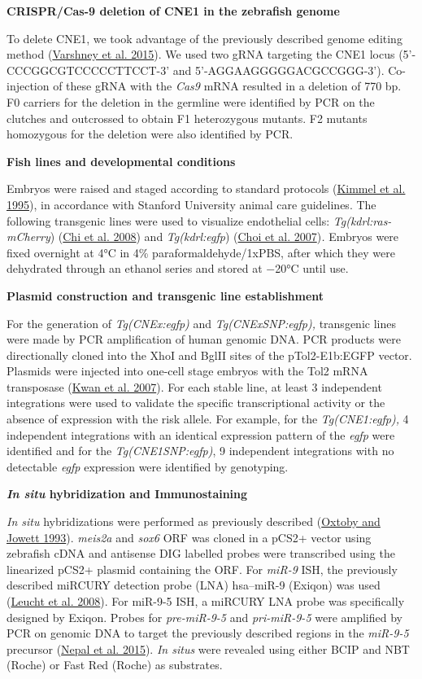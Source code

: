 \documentclass[]{article}
\begin{document}
\textbf{CRISPR/Cas-9 deletion of CNE1 in the zebrafish genome}

To delete CNE1, we took advantage of the previously described genome
editing method (\protect\hyperlink{_ENREF_33}{Varshney et al. 2015}). We
used two gRNA targeting the CNE1 locus (5'-CCCGGCGTCCCCCTTCCT-3' and
5'-AGGAAGGGGGACGCCGGG-3'). Co-injection of these gRNA with the
\emph{Cas9} mRNA resulted in a deletion of 770 bp. F0 carriers for the
deletion in the germline were identified by PCR on the clutches and
outcrossed to obtain F1 heterozygous mutants. F2 mutants homozygous for
the deletion were also identified by PCR.

\textbf{Fish lines and developmental conditions}

Embryos were raised and staged according to standard protocols
(\protect\hyperlink{_ENREF_14}{Kimmel et al. 1995}), in accordance with
Stanford University animal care guidelines. The following transgenic
lines were used to visualize endothelial cells:
\emph{Tg(kdrl:ras-mCherry}) (\protect\hyperlink{_ENREF_2}{Chi et al.
2008}) and \emph{Tg(kdrl:egfp}) (\protect\hyperlink{_ENREF_3}{Choi et
al. 2007})\emph{.} Embryos were fixed overnight at 4°C in 4\%
paraformaldehyde/1xPBS, after which they were dehydrated through an
ethanol series and stored at −20°C until use.

\textbf{Plasmid construction and transgenic line establishment}

For the generation of \emph{Tg(CNEx:egfp)} and \emph{Tg(CNExSNP:egfp),}
transgenic lines were made by PCR amplification of human genomic DNA.
PCR products were directionally cloned into the XhoI and BglII sites of
the pTol2-E1b:EGFP vector. Plasmids were injected into one-cell stage
embryos with the Tol2 mRNA transposase
(\protect\hyperlink{_ENREF_15}{Kwan et al. 2007}). For each stable line,
at least 3 independent integrations were used to validate the specific
transcriptional activity or the absence of expression with the risk
allele. For example, for the \emph{Tg(CNE1:egfp),} 4 independent
integrations with an identical expression pattern of the \emph{egfp}
were identified and for the \emph{Tg(CNE1SNP:egfp)}, 9 independent
integrations with no detectable \emph{egfp} expression were identified
by genotyping.

\textbf{\emph{In situ} hybridization and Immunostaining}

\emph{In situ} hybridizations were performed as previously described
(\protect\hyperlink{_ENREF_24}{Oxtoby and Jowett 1993}). \emph{meis2a}
and \emph{sox6} ORF was cloned in a pCS2+ vector using zebrafish cDNA
and antisense DIG labelled probes were transcribed using the linearized
pCS2+ plasmid containing the ORF. For \emph{miR-9} ISH, the previously
described miRCURY detection probe (LNA) hsa--miR-9 (Exiqon) was used
(\protect\hyperlink{_ENREF_16}{Leucht et al. 2008}). For miR-9-5 ISH, a
miRCURY LNA probe was specifically designed by Exiqon. Probes for
\emph{pre-miR-9-5} and \emph{pri-miR-9-5} were amplified by PCR on
genomic DNA to target the previously described regions in the
\emph{miR-9-5} precursor (\protect\hyperlink{_ENREF_21}{Nepal et al.
2015}). \emph{In situs} were revealed using either BCIP and NBT (Roche)
or Fast Red (Roche) as substrates.
\end{document}
